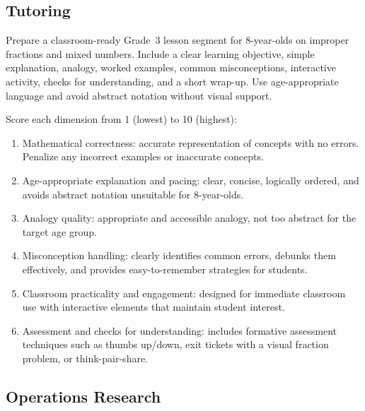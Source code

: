 \subsection{Tutoring}
\label{appendix:tutoring}

\begin{tcolorbox}[taskprompt, title=Task Prompt — Tutoring]
Prepare a classroom-ready Grade~3 lesson segment for 8-year-olds on improper
fractions and mixed numbers. Include a clear learning objective, simple explanation,
analogy, worked examples, common misconceptions, interactive activity, checks for
understanding, and a short wrap-up. Use age-appropriate language and avoid abstract
notation without visual support.
\end{tcolorbox}

\begin{tcolorbox}[rubricbox, title=Evaluation Rubric — Tutoring]
Score each dimension from 1 (lowest) to 10 (highest):
\begin{enumerate}
  \setlength{\itemsep}{0pt}
  \item Mathematical correctness: accurate representation of concepts with no
        errors. Penalize any incorrect examples or inaccurate concepts.
  \item Age-appropriate explanation and pacing: clear, concise, logically ordered,
        and avoids abstract notation unsuitable for 8-year-olds.
  \item Analogy quality: appropriate and accessible analogy, not too abstract for
        the target age group.
  \item Misconception handling: clearly identifies common errors, debunks them
        effectively, and provides easy-to-remember strategies for students.
  \item Classroom practicality and engagement: designed for immediate classroom
        use with interactive elements that maintain student interest.
  \item Assessment and checks for understanding: includes formative assessment
        techniques such as thumbs up/down, exit tickets with a visual fraction
        problem, or think-pair-share.
\end{enumerate}
\end{tcolorbox}

\subsection{Operations Research}
\label{appendix:or}

